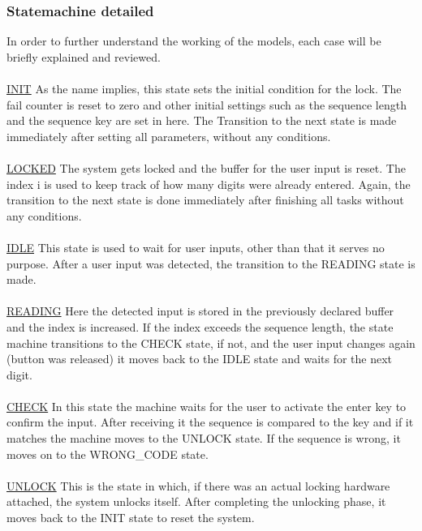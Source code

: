 \subsubsection{Statemachine detailed}
In order to further understand the working of the models, each case will be briefly explained and reviewed. 
\\~\\
\underline{INIT} \newline
As the name implies, this state sets the initial condition for the lock. The fail counter is reset to zero and other initial settings such as the sequence length and the sequence key are set in here. The Transition to the next state is made immediately after setting all parameters, without any conditions.
\\~\\
\underline{LOCKED} \newline
The system gets locked and the buffer for the user input is reset. The index i is used to keep track of how many digits were already entered. Again, the transition to the next state is done immediately after finishing all tasks without any conditions.
\\~\\
\underline{IDLE} \newline
This state is used to wait for user inputs, other than that it serves no purpose. After a user input was detected, the transition to the READING state is made.
\\~\\
\underline{READING} \newline
Here the detected input is stored in the previously declared buffer and the index is increased. If the index exceeds the sequence length, the state machine transitions to the CHECK state, if not, and the user input changes again (button was released) it moves back to the IDLE state and waits for the next digit.
\\~\\
\underline{CHECK} \newline
In this state the machine waits for the user to activate the enter key to confirm the input. After receiving it the sequence is compared to the key and if it matches the machine moves to the UNLOCK state. If the sequence is wrong, it moves on to the WRONG\_CODE state.
\\~\\
\underline{UNLOCK} \newline
This is the state in which, if there was an actual locking hardware attached, the system unlocks itself. After completing the unlocking phase, it moves back to the INIT state to reset the system.
